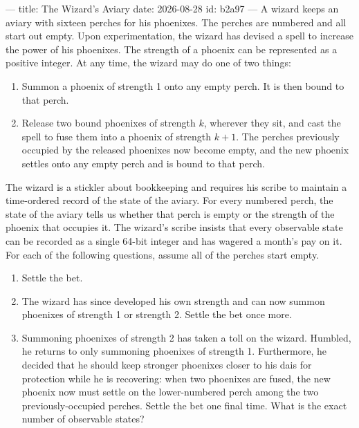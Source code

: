 ---
title: The Wizard's Aviary
date: 2026-08-28
id: b2a97
---
A wizard keeps an aviary with sixteen perches for his phoenixes. The perches are numbered and all start out empty. Upon experimentation, the wizard has devised a spell to increase the power of his phoenixes. The strength of a phoenix can be represented as a positive integer. At any time, the wizard may do one of two things:

\begin{enumerate}
\item Summon a phoenix of strength 1 onto any empty perch. It is then bound to that perch.
\item Release two bound phoenixes of strength $k$, wherever they sit, and cast the spell to fuse them into a phoenix of strength $k+1$. The perches previously occupied by the released phoenixes now become empty, and the new phoenix settles onto any empty perch and is bound to that perch.
\end{enumerate}

The wizard is a stickler about bookkeeping and requires his scribe to maintain a time-ordered record of the state of the aviary. For every numbered perch, the state of the aviary tells us whether that perch is empty or the strength of the phoenix that occupies it. The wizard's scribe insists that every observable state can be recorded as a single 64-bit integer and has wagered a month's pay on it. For each of the following questions, assume all of the perches start empty.

\begin{enumerate}
\item[(a)] Settle the bet.
\item[(b)] The wizard has since developed his own strength and can now summon phoenixes of strength 1 or strength 2. Settle the bet once more.
\item[(c)] Summoning phoenixes of strength 2 has taken a toll on the wizard. Humbled, he returns to only summoning phoenixes of strength 1. Furthermore, he decided that he should keep stronger phoenixes closer to his dais for protection while he is recovering: when two phoenixes are fused, the new phoenix now must settle on the lower-numbered perch among the two previously-occupied perches. Settle the bet one final time. What is the exact number of observable states?
\end{enumerate}

